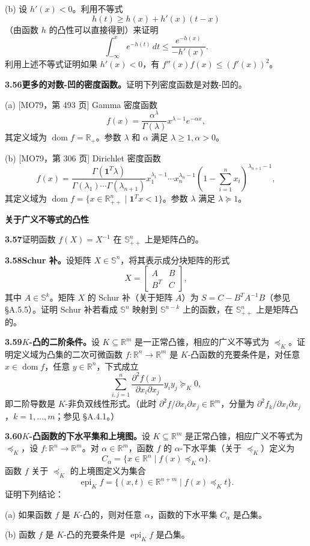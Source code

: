 \documentclass[UTF8, 12pt, fontset=fandol, oneside]{ctexart}
\DeclareMathOperator{\dom}{dom}
\DeclareMathOperator{\epi}{epi}
\begin{document}
(b) 设 $h'(x)<0$。利用不等式
\[
h(t)\geq h(x)+h'(x)(t-x)
\]
（由函数 $h$ 的凸性可以直接得到）来证明
\[
\int_{-\infty}^x e^{-h(t)}\,dt\leq \frac{e^{-h(x)}}{-h'(x)}.
\]
利用上述不等式证明如果 $h'(x)<0$，有 $f''(x)f(x)\leq(f'(x))^2$。

\noindent\textbf{3.56\quad 更多的对数-凹的密度函数。}\quad 证明下列密度函数是对数-凹的。

(a) [MO79，第 493 页] Gamma 密度函数
\[
f(x)=\frac{\alpha^\lambda}{\Gamma(\lambda)}x^{\lambda-1}e^{-\alpha x},
\]
其定义域为 $\dom f=\mathbb{R}_+$。参数 $\lambda$ 和 $\alpha$ 满足 $\lambda\geq1,\alpha>0$。

(b) [MO79，第 306 页] Dirichlet 密度函数
\[
f(x)=\frac{\Gamma(\mathbf{1}^T\lambda)}{\Gamma(\lambda_1)\cdots\Gamma(\lambda_{n+1})}x_1^{\lambda_1-1}\cdots x_n^{\lambda_n-1}\left(1-\sum_{i=1}^n x_i\right)^{\lambda_{n+1}-1},
\]
其定义域为 $\dom f=\{x\in\mathbb{R}_{++}^n\mid \mathbf{1}^Tx<1\}$。参数 $\lambda$ 满足 $\lambda\succeq1$。

\noindent\textbf{关于广义不等式的凸性}

\noindent\textbf{3.57}\quad 证明函数 $f(X)=X^{-1}$ 在 $\mathbb{S}_{++}^n$ 上是矩阵凸的。

\noindent\textbf{3.58\quad Schur 补。}\quad 设矩阵 $X\in\mathbb{S}^n$，将其表示成分块矩阵的形式
\[
X=
\begin{bmatrix}
A & B\\
B^T & C
\end{bmatrix},
\]
其中 $A\in\mathbb{S}^k$。矩阵 $X$ 的 Schur 补（关于矩阵 $A$）为 $S=C-B^TA^{-1}B$（参见 \S A.5.5）。证明 Schur 补若看成 $\mathbb{S}^n$ 映射到 $\mathbb{S}^{n-k}$ 上的函数，在 $\mathbb{S}_{++}^n$ 上是矩阵凸的。

\noindent\textbf{3.59\quad $K$-凸的二阶条件。}\quad 设 $K\subseteq\mathbb{R}^m$ 是一正常凸锥，相应的广义不等式为 $\preceq_K$。证明定义域为凸集的二次可微函数 $f:\mathbb{R}^n\to\mathbb{R}^m$ 是 $K$-凸函数的充要条件是，对任意 $x\in\dom f$，任意 $y\in\mathbb{R}^n$，下式成立
\[
\sum_{i,j=1}^n \frac{\partial^2 f(x)}{\partial x_i\partial x_j}y_iy_j\succeq_K0,
\]
即二阶导数是 $K$-非负双线性形式。（此时 $\partial^2 f/\partial x_i\partial x_j\in\mathbb{R}^m$，分量为 $\partial^2 f_k/\partial x_i\partial x_j$，$k=1,\ldots,m$；参见 \S A.4.1。）

\noindent\textbf{3.60\quad $K$-凸函数的下水平集和上境图。}\quad 设 $K\subseteq\mathbb{R}^m$ 是正常凸锥，相应广义不等式为 $\preceq_K$，设 $f:\mathbb{R}^n\to\mathbb{R}^m$。对 $\alpha\in\mathbb{R}^m$，函数 $f$ 的 $\alpha$-下水平集（关于 $\preceq_K$）定义为
\[
C_\alpha=\{x\in\mathbb{R}^n\mid f(x)\preceq_K\alpha\}.
\]
函数 $f$ 关于 $\preceq_K$ 的上境图定义为集合
\[
\epi_K f=\{(x,t)\in\mathbb{R}^{n+m}\mid f(x)\preceq_K t\}.
\]
证明下列结论：

(a) 如果函数 $f$ 是 $K$-凸的，则对任意 $\alpha$，函数的下水平集 $C_\alpha$ 是凸集。

(b) 函数 $f$ 是 $K$-凸的充要条件是 $\epi_K f$ 是凸集。
\end{document}
